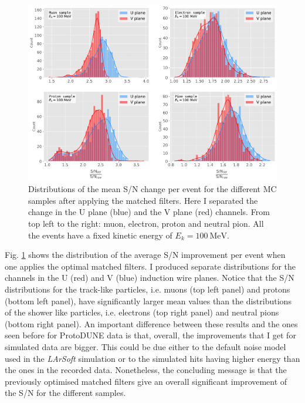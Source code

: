 \begin{figure}[h!]
	\centering
	\includegraphics[width=0.9\linewidth]{Images/Matched_Filter/larsoft_sn_hists.pdf}
	\caption[Distributions of the mean S/N change per event for the different MC samples after applying the matched filters.]{Distributions of the mean S/N change per event for the different MC samples after applying the matched filters. Here I separated the change in the U plane (blue) and the V plane (red) channels. From top left to the right: muon, electron, proton and neutral pion. All the events have a fixed kinetic energy of $E_{k} = 100 \ \mathrm{MeV}$.}
	\label{fig:mono_summary_hist}
\end{figure}

Fig. \ref{fig:mono_summary_hist} shows the distribution of the average S/N improvement per event when one applies the optimal matched filters. I produced separate distributions for the channels in the U (red) and V (blue) induction wire planes. Notice that the S/N distributions for the track-like particles, i.e. muons (top left panel) and protons (bottom left panel), have significantly larger mean values than the distributions of the shower like particles, i.e. electrons (top right panel) and neutral pions (bottom right panel). An important difference between these results and the ones seen before for ProtoDUNE data is that, overall, the improvements that I get for simulated data are bigger. This could be due either to the default noise model used in the \textit{LArSoft} simulation or to the simulated hits having higher energy than the ones in the recorded data. Nonetheless, the concluding message is that the previously optimised matched filters give an overall significant improvement of the S/N for the different samples.

